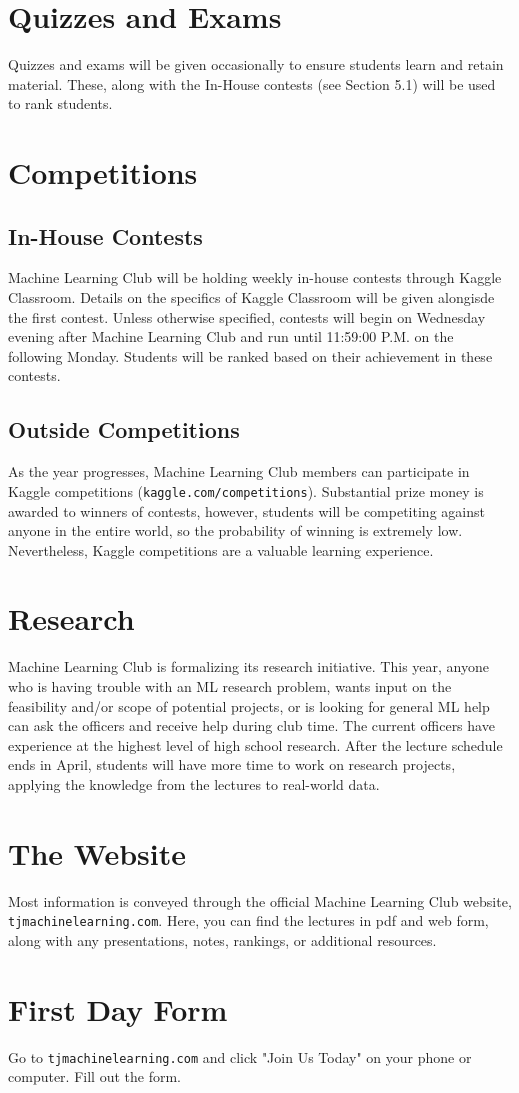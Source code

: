 \documentclass{article}
\begin{document}
\section{Quizzes and Exams}
Quizzes and exams will be given occasionally to ensure students learn and retain material. These, along with the In-House contests (see Section 5.1) will be used to rank students.

\section{Competitions}
\subsection{In-House Contests}
Machine Learning Club will be holding weekly in-house contests through Kaggle Classroom. Details on the specifics of Kaggle Classroom will be given alongisde the first contest. Unless otherwise specified, contests will begin on Wednesday evening after Machine Learning Club and run until 11:59:00 P.M. on the following Monday. Students will be ranked based on their achievement in these contests.

\subsection{Outside Competitions}
As the year progresses, Machine Learning Club members can participate in Kaggle competitions (\texttt{kaggle.com/competitions}). Substantial prize money is awarded to winners of contests, however, students will be competiting against anyone in the entire world, so the probability of winning is extremely low. Nevertheless, Kaggle competitions are a valuable learning experience.

\section{Research}
Machine Learning Club is formalizing its research initiative. This year, anyone who is having trouble with an ML research problem, wants input on the feasibility and/or scope of potential projects, or is looking for general ML help can ask the officers and receive help during club time. The current officers have experience at the highest level of high school research. After the lecture schedule ends in April, students will have more time to work on research projects, applying the knowledge from the lectures to real-world data.

\section{The Website}
Most information is conveyed through the official Machine Learning Club website, \texttt{tjmachinelearning.com}. Here, you can find the lectures in pdf and web form, along with any presentations, notes, rankings, or additional resources.

\section{First Day Form}
Go to \texttt{tjmachinelearning.com} and click "Join Us Today" on your phone or computer. Fill out the form.
\end{document}
